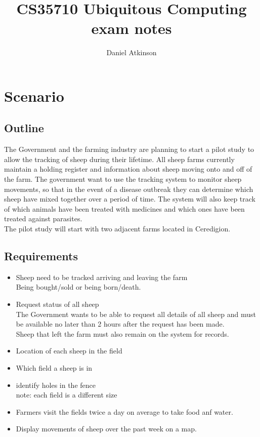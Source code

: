 \documentclass{article}
\begin{document}
\title{CS35710 Ubiquitous Computing exam notes}

\author{Daniel Atkinson}

\maketitle

\section{Scenario}
\subsection{Outline}
The Government and the farming industry are planning to start a pilot study to allow the tracking of sheep during their lifetime.  All sheep farms currently maintain a holding register and information about sheep moving onto and off of the farm.  The government want to use the tracking system to monitor sheep movements, so that in the event of a disease outbreak they can determine which sheep have mixed together over a period of time.  The system will also keep track of which animals have been treated with medicines and which ones have been treated against parasites.
\\The pilot study will start with two adjacent farms located in Ceredigion.
\subsection{Requirements}
\begin{itemize}
\item Sheep need to be tracked arriving and leaving the farm
\\Being bought/sold or being born/death.
\item Request status of all sheep
\\The Government wants to be able to request all details of all sheep and must be available no later than 2 hours after the request has been made.
\\Sheep that left the farm must also remain on the system for records.
\item Location of each sheep in the field
\item Which field a sheep is in
\item identify holes in the fence
\\note: each field is a different size
\item Farmers visit the fields twice a day on average to take food anf water.
\item Display movements of sheep over the past week on a map.
\end{itemize}
\end{document}
